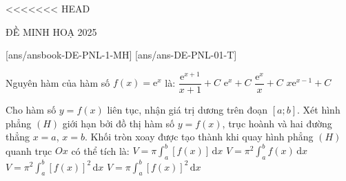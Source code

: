 <<<<<<< HEAD
\begin{name}
    {\tenchude}
    {ĐỀ MINH HOẠ 2025}
    {\tentruong}
    {\thoigian}
\end{name}

[ans/ansbook-DE-PNL-1-MH]
\TN
{}[ans/ans-DE-PNL-01-T]


\begin{ex}%
    Nguyên hàm của hàm số $f(x) = \mathrm{e}^x$ là:
    \choice
    {$\dfrac{\mathrm{e}^{x+1}}{x+1} + C$}
    {\True $\mathrm{e}^x + C$}
    {$\dfrac{\mathrm{e}^x}{x} + C$}
    {$x \mathrm{e}^{x-1} + C$}
\end{ex}

\begin{ex}%
    Cho hàm số $y = f(x)$ liên tục, nhận giá trị dương trên đoạn $[a;b]$. Xét hình phẳng $(H)$ giới hạn bởi đồ thị hàm số $y = f(x)$, trục hoành và hai đường thẳng $x = a$, $x = b$. Khối tròn xoay được tạo thành khi quay hình phẳng $(H)$ quanh trục $Ox$ có thể tích là:
    \choice
    {$V = \pi \displaystyle \int_a^b [f(x)] \mathrm{\,d}x$}
    {$V = \pi^2 \displaystyle \int_a^b f(x) \mathrm{\,d}x$}
    {$V = \pi^2 \displaystyle \int_a^b [f(x)]^2 \mathrm{\,d}x$}
    {\True $V = \pi \displaystyle \int_a^b [f(x)]^2 \mathrm{\,d}x$}
\end{ex}

